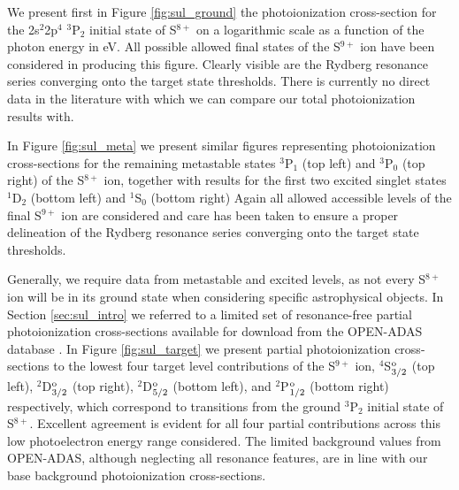 We present first in Figure \ref{fig:sul_ground} the photoionization cross-section for the 2s$^2$2p$^4$ $^3$P$_2$ initial state of S$^{8+}$ on a logarithmic scale as a function of the photon energy in eV. All possible allowed final states of the S$^{9+}$ ion have been considered in producing this figure. Clearly visible are the Rydberg resonance series converging onto the target state thresholds. There is currently no direct data in the literature with which we can compare our total photoionization results with.

In Figure \ref{fig:sul_meta} we present similar figures representing photoionization cross-sections for the remaining metastable states $^3$P$_1$ (top left) and $^3$P$_0$ (top right) of the S$^{8+}$ ion, together with results for the first two excited singlet states $^1$D$_2$ (bottom left) and $^1$S$_0$ (bottom right) Again all allowed accessible levels of the final S$^{9+}$ ion are considered and care has been taken to ensure a proper delineation of the Rydberg resonance series converging onto the target state thresholds.

Generally, we require data from metastable and excited levels, as not every S$^{8+}$ ion will be in its ground state when considering specific astrophysical objects. In Section \ref{sec:sul_intro} we referred to a limited set of resonance-free partial photoionization cross-sections available for download from the OPEN-ADAS database \cite{2005MNRAS.360..458B}. In Figure \ref{fig:sul_target} we present partial photoionization cross-sections to the lowest four target level contributions of the S$^{9+}$ ion, $^4$S$^{\rm{o}}_{3/2}$ (top left), $^2$D$^{\rm{o}}_{3/2}$ (top right), $^2$D$^{\rm{o}}_{5/2}$ (bottom left), and $^2$P$^{\rm{o}}_{1/2}$ (bottom right) respectively, which correspond to transitions from the ground $^3$P$_2$ initial state of S$^{8+}$. Excellent agreement is evident for all four partial contributions across this low photoelectron energy range considered. The limited background values from OPEN-ADAS, although neglecting all resonance features, are in line with our base background photoionization cross-sections.

